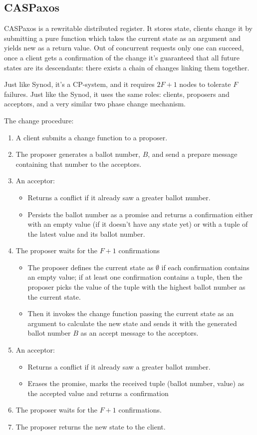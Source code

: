 \documentclass[12pt]{article}
\begin{document}
\subsection{CASPaxos}

CASPaxos is a rewritable distributed register. It stores state, clients change it by submitting a pure function which takes the current state as an argument and yields new as a return value. Out of concurrent requests only one can succeed, once a client gets a confirmation of the change it's guaranteed that all future states are its descendants: there exists a chain of changes linking them together.

Just like Synod, it's a CP-system, and it requires $2F+1$ nodes to tolerate $F$ failures. Just like the Synod, it uses the same roles: clients, proposers and acceptors, and a very similar two phase change mechanism.

The change procedure:
\begin{enumerate}
  \item A client submits a change function to a proposer.
  \item The proposer generates a ballot number, $B$, and send a prepare message containing that number to the acceptors.
  \item An acceptor:
  \begin{itemize}
    \item Returns a conflict if it already saw a greater ballot number.
    \item Persists the ballot number as a promise and returns a confirmation either with an empty value (if it doesn't have any state yet) or with a tuple of the latest value and its ballot number.
  \end{itemize}
  \item The proposer waits for the $F+1$ confirmations
  \begin{itemize}
    \item The proposer defines the current state as $\emptyset$ if each confirmation contains an empty value; if at least one confirmation contains a tuple, then the proposer picks the value of the tuple with the highest ballot number as the current state.
    \item Then it invokes the change function passing the current state as an argument to calculate the new state and sends it with the generated ballot number $B$ as an accept message to the acceptors.
  \end{itemize}
  \item An acceptor:
  \begin{itemize}
    \item Returns a conflict if it already saw a greater ballot number.
    \item Erases the promise, marks the received tuple (ballot number, value) as the accepted value and returns a confirmation
  \end{itemize}
  \item The proposer waits for the $F+1$ confirmations.
  \item The proposer returns the new state to the client.
\end{enumerate}
\end{document}
